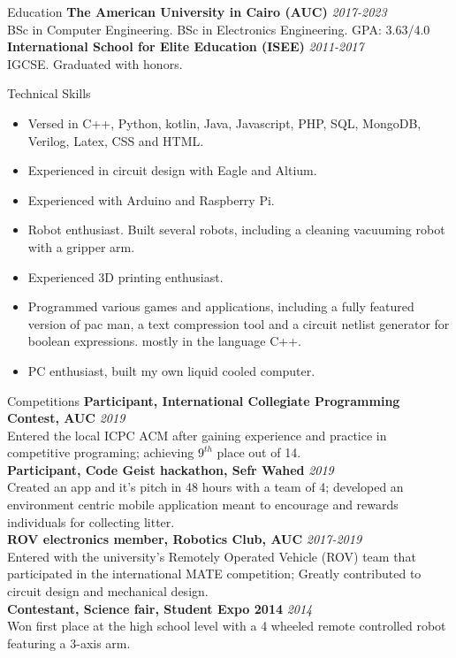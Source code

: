 \documentclass{resume}
\begin{document}
\begin{small}
	
	\begin{rSection}{Education}
		{\bf The American University in Cairo (AUC)} \hfill {\em 2017-2023} \\
		BSc in Computer Engineering. BSc in Electronics Engineering. GPA: 3.63/4.0\\
		{\bf International School for Elite Education (ISEE)} \hfill {\em 2011-2017}
		\\ IGCSE. Graduated with honors.
	\end{rSection}
	
	\begin{rSection}{Technical Skills}
		\begin{itemize}
			\itemsep-0.4em
			\item Versed in C++, Python, kotlin, Java, Javascript, PHP, SQL, MongoDB, Verilog, Latex, CSS and HTML.
			\item Experienced in circuit design with Eagle and Altium.
			\item Experienced with Arduino and Raspberry Pi.
			\item Robot enthusiast. Built several robots, including a cleaning vacuuming robot with a gripper arm.
			\item Experienced 3D printing enthusiast.
			\item Programmed various games and applications, including a fully featured version of pac man, a text compression tool and a circuit netlist generator for boolean expressions. mostly in the language C++.
			\item PC enthusiast, built my own liquid cooled computer.
		\end{itemize}
	\end{rSection}

	\begin{rSection}{Competitions}
		{\bf Participant, International Collegiate Programming Contest, AUC} \hfill {\em 2019} \\
		Entered the local ICPC ACM after gaining experience and practice in competitive programing; achieving $9^{th}$ place out of 14. \\
		{\bf Participant, Code Geist hackathon, Sefr Wahed} \hfill {\em 2019} \\
		Created an app and it's pitch in 48 hours with a team of 4; developed an environment centric mobile application meant to encourage and rewards individuals for collecting litter.\\
		{\bf ROV electronics member, Robotics Club, AUC} \hfill {\em 2017-2019} \\
		Entered with the university's Remotely Operated Vehicle (ROV) team that participated in the international MATE competition; Greatly contributed to circuit design and mechanical design. \\
		{\bf Contestant, Science fair, Student Expo 2014} \hfill {\em 2014} \\
		Won first place at the high school level with a 4 wheeled remote controlled robot featuring a 3-axis arm.
	\end{rSection}
	

\end{small}
\end{document}
